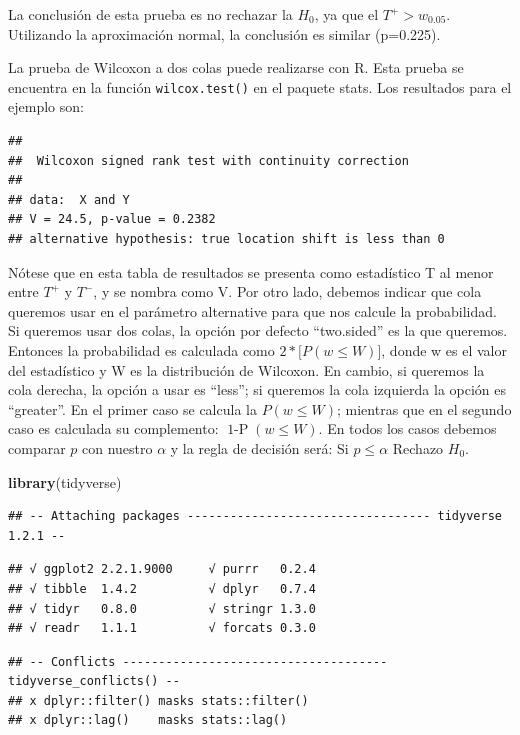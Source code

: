 \documentclass[]{book}
\newenvironment{Shaded}{\begin{snugshade}}{\end{snugshade}}
\newcommand{\KeywordTok}[1]{\textcolor[rgb]{0.13,0.29,0.53}{\textbf{#1}}}
\newcommand{\NormalTok}[1]{#1}
\theoremstyle{definition}
\theoremstyle{definition}
\theoremstyle{definition}
\theoremstyle{remark}
\begin{document}
La conclusión de esta prueba es no rechazar la \(H_{0}\), ya que el
\(T^{+} > w_{0.05}\). Utilizando la aproximación normal, la conclusión
es similar (p=0.225).

La prueba de Wilcoxon a dos colas puede realizarse con R. Esta prueba se
encuentra en la función \texttt{wilcox.test()} en el paquete stats. Los
resultados para el ejemplo son:

\begin{verbatim}
## 
##  Wilcoxon signed rank test with continuity correction
## 
## data:  X and Y
## V = 24.5, p-value = 0.2382
## alternative hypothesis: true location shift is less than 0
\end{verbatim}

Nótese que en esta tabla de resultados se presenta como estadístico T al
menor entre \(T^{+}\) y \(T^{-}\), y se nombra como V. Por otro lado,
debemos indicar que cola queremos usar en el parámetro alternative para
que nos calcule la probabilidad. Si queremos usar dos colas, la opción
por defecto ``two.sided'' es la que queremos. Entonces la probabilidad
es calculada como \(2*\lbrack P(w \leq W)\rbrack\), donde w es el valor
del estadístico y W es la distribución de Wilcoxon. En cambio, si
queremos la cola derecha, la opción a usar es ``less''; si queremos la
cola izquierda la opción es ``greater''. En el primer caso se calcula la
\(P(w \leq W)\); mientras que en el segundo caso es calculada su
complemento: \(\operatorname{1-P}\left( w \leq W \right)\). En todos los
casos debemos comparar \(p\) con nuestro \(\alpha\) y la regla de
decisión será: Si \(p \leq \alpha\) Rechazo \(H_{0}\).

\begin{Shaded}
\begin{Highlighting}[]
\KeywordTok{library}\NormalTok{(tidyverse)}
\end{Highlighting}
\end{Shaded}

\begin{verbatim}
## -- Attaching packages ---------------------------------- tidyverse 1.2.1 --
\end{verbatim}

\begin{verbatim}
## √ ggplot2 2.2.1.9000     √ purrr   0.2.4     
## √ tibble  1.4.2          √ dplyr   0.7.4     
## √ tidyr   0.8.0          √ stringr 1.3.0     
## √ readr   1.1.1          √ forcats 0.3.0
\end{verbatim}

\begin{verbatim}
## -- Conflicts ------------------------------------- tidyverse_conflicts() --
## x dplyr::filter() masks stats::filter()
## x dplyr::lag()    masks stats::lag()
\end{verbatim}
\end{document}
